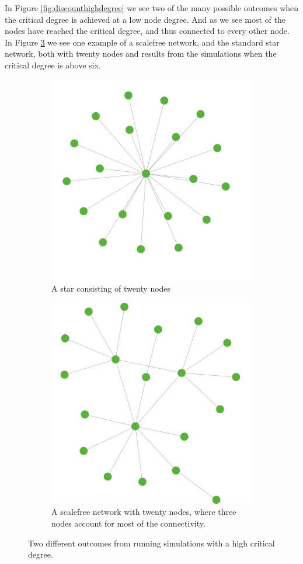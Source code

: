 In Figure \ref{fig:discounthighdegree} we see two of the many possible outcomes when the critical degree is achieved at a low node degree. And as we see most of the nodes have reached the critical degree, and thus connected to every other node.
In Figure \ref{fig:star1} we see one example of a scalefree network, and the standard star network, both with twenty nodes and results from the simulations when the critical degree is above six. 
\begin{figure}[h]
\centering
\begin{subfigure}{.9\textwidth}
  \centering
 \includegraphics[width=0.7\linewidth]{../Figures/Star-20-nodes.png}
  \caption{\label{fig:star:a} A star consisting of twenty nodes}
\end{subfigure}
\quad
  
\begin{subfigure}{.9\textwidth}
  \centering
  \includegraphics[width=0.7\linewidth]{../Figures/Scalefree-20-nodes.png}
  \caption{\label{fig:star:b} A scalefree network with twenty nodes, where three nodes account for most of the connectivity.}
\end{subfigure}
\caption{\label{fig:star1} Two different outcomes from running simulations with a high critical degree.}
\end{figure}

